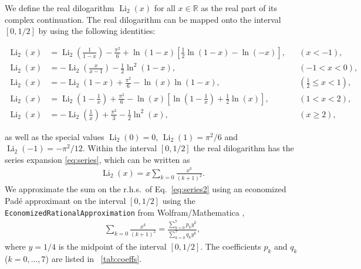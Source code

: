 \documentclass[10pt,DIV16,twocolumn,numbers=noenddot]{scrartcl}
\newcommand{\Li}{\operatorname{Li}_2}
\newcommand{\tabref}[1]{\tablename~\ref{#1}}
\begin{document}
We define the real dilogarithm $\Li(x)$ for all $x\in\mathbb{R}$ as
the real part of its complex continuation.  The real dilogarithm can
be mapped onto the interval $[0,1/2]$ by using the following
identities:
%
\begin{widetext}%
\begin{align}%
  \Li(x) &= \Li\left(\frac{1}{1-x}\right) - \frac{\pi^2}{6} + \ln(1-x)\left[\frac{1}{2}\ln(1-x) - \ln(-x)\right], && (x<-1), \\
  \Li(x) &= -\Li\left(\frac{x}{x-1}\right) - \frac{1}{2}\ln^2(1-x), && (-1<x<0), \\
  \Li(x) &= -\Li(1-x) + \frac{\pi^2}{6} - \ln(x) \ln(1-x), && (\frac{1}{2}\leq x<1), \\
  \Li(x) &= \Li\left(1-\frac{1}{x}\right) + \frac{\pi^2}{6} - \ln(x)\left[\ln\left(1-\frac{1}{x}\right) + \frac{1}{2}\ln(x)\right], && (1<x<2), \\
  \Li(x) &= -\Li\left(\frac{1}{x}\right) + \frac{\pi^2}{3} - \frac{1}{2} \ln^2(x), && (x\geq 2),%
\end{align}%
\end{widetext}%
%
as well as the special values $\Li(0)=0$, $\Li(1)=\pi^2/6$ and
$\Li(-1)=-\pi^2/12$.  Within the interval $[0,1/2]$ the real
dilogarithm has the series expansion \eqref{eq:series}, which can be
written as
%
\begin{align}
  \Li(x) = x \sum_{k=0} \frac{x^{k}}{(k+1)^2}.
  \label{eq:series2}
\end{align}
%
We approximate the sum on the r.h.s.\ of Eq.~\eqref{eq:series2} using
an economized Padé approximant on the interval $[0,1/2]$ using the
\texttt{EconomizedRationalApproximation} from Wolfram/Mathematica
\cite{mathematica},
%
\begin{align}
  \sum_{k=0} \frac{x^{k}}{(k+1)^2} =
  \frac{\sum_{k=0}^7 p_ky^k}{\sum_{k=0}^7 q_ky^k},
  \label{eq:pade2}
\end{align}
%
where $y=1/4$ is the midpoint of the interval $[0,1/2]$.  The
coefficients $p_k$ and $q_k$ ($k=0,\ldots,7$) are listed in
\tabref{tab:coeffs}.
%
\end{document}
